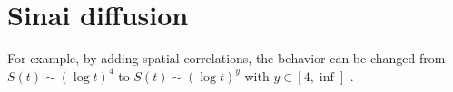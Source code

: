 \section{Sinai diffusion}

For example, by adding spatial correlations, the behavior can be changed 
from $S(t) \sim (\log t)^4$ to $S(t) \sim (\log t)^y$ with $y \in [4,\inf]$ \cite{stanley_generalization_1987}.


